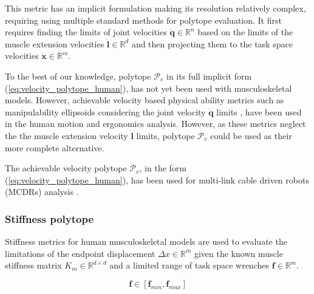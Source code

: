 This metric has an implicit formulation making its resolution relatively complex, requiring using multiple standard methods for polytope evaluation. It first requires finding the limits of joint velocities $\dot{\bm{q}} \in \mathbb{R}^n$ based on the limits of the muscle extension velocities $\dot{\bm{l}} \in \mathbb{R}^d$ and then projecting them to the task space velocities $\dot{\bm{x}} \in \mathbb{R}^m$. 

To the best of our knowledge, polytope $\mathcal{P}_v$ in its full implicit form (\ref{eq:velocity_polytope_human}), has not yet been used with musculoskeletal models. However, achievable velocity based physical ability metrics such as manipulability ellipsoids considering the joint velocity $\dot{\bm{q}}$ limits \cite{Chiu1988,Petric2019,Yang2017}, have been used in the human motion and ergonomics analysis. However, as these metrics neglect the the muscle extension velocity $\dot{\bm{l}}$ limits, polytope $\mathcal{P}_v$ could be used as their more complete alternative. 

The achievable velocity polytope $\mathcal{P}_v$, in the form (\ref{eq:velocity_polytope_human}), has been used for multi-link cable driven robots (MCDRs) analysis \cite{Muralidharan2022}.

\subsubsection{Stiffness polytope}
\label{ch:human_stiffness_poly}
Stiffness metrics for human musculoskeletal models are used to evaluate the limitations of the endpoint displacement $\Delta x \in \mathbb{R}^m$ given the known muscle stiffness matrix $K_m \in \mathbb{R}^{d\times d}$ and a limited range of task space wrenches $\bm{f} \in \mathbb{R}^m$. 

\begin{equation}
    \bm{f}\in\left[\bm{f}_{min}, \bm{f}_{max} \right]
    \label{eq:force_stiff_range_human}
\end{equation}

